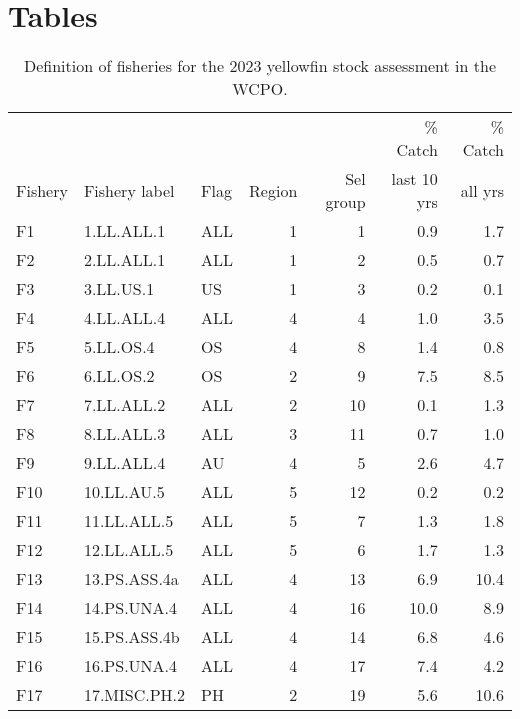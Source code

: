 
\section{Tables}

\vspace{2ex}

\begin{table}[h]
  \centering
  \caption{\label{tab:fisheries_definitions} Definition of fisheries for the 2023 yellowfin stock assessment in the WCPO.}
  \footnotesize
  \begin{tabular}{lllrrrr}
    \hline
    ~       &               &      &        &           & \% Catch    & \% Catch\\
    Fishery & Fishery label & Flag & Region & Sel group & last 10 yrs & all yrs \\
    \hline
    F1  & 1.LL.ALL.1   & ALL   & 1 &  1 &  0.9 &  1.7\\
    F2  & 2.LL.ALL.1   & ALL   & 1 &  2 &  0.5 &  0.7\\
    F3  & 3.LL.US.1    & US    & 1 &  3 &  0.2 &  0.1\\
    F4  & 4.LL.ALL.4   & ALL   & 4 &  4 &  1.0 &  3.5\\
    F5  & 5.LL.OS.4    & OS    & 4 &  8 &  1.4 &  0.8\\
    F6  & 6.LL.OS.2    & OS    & 2 &  9 &  7.5 &  8.5\\
    F7  & 7.LL.ALL.2   & ALL   & 2 & 10 &  0.1 &  1.3\\
    F8  & 8.LL.ALL.3   & ALL   & 3 & 11 &  0.7 &  1.0\\
    F9  & 9.LL.ALL.4   & AU    & 4 &  5 &  2.6 &  4.7\\
    F10 & 10.LL.AU.5   & ALL   & 5 & 12 &  0.2 &  0.2\\
    F11 & 11.LL.ALL.5  & ALL   & 5 &  7 &  1.3 &  1.8\\
    F12 & 12.LL.ALL.5  & ALL   & 5 &  6 &  1.7 &  1.3\\
    F13 & 13.PS.ASS.4a & ALL   & 4 & 13 &  6.9 & 10.4\\
    F14 & 14.PS.UNA.4  & ALL   & 4 & 16 & 10.0 &  8.9\\
    F15 & 15.PS.ASS.4b & ALL   & 4 & 14 &  6.8 &  4.6\\
    F16 & 16.PS.UNA.4  & ALL   & 4 & 17 &  7.4 &  4.2\\
    F17 & 17.MISC.PH.2 & PH    & 2 & 19 &  5.6 & 10.6\\

\end{tabular}
\end{table}
